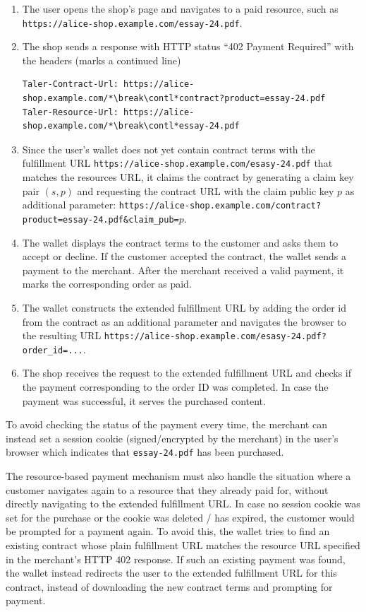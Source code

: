 \begin{enumerate}
  \item The user opens the shop's page and navigates to a paid resource, such
    as \nolinkurl{https://alice-shop.example.com/essay-24.pdf}.
  \item The shop sends a response with HTTP status ``402 Payment Required''
    with the headers (\contl marks a continued line)
\begin{lstlisting}[style=myhttp]
Taler-Contract-Url: https://alice-shop.example.com/*\break\contl*contract?product=essay-24.pdf
Taler-Resource-Url: https://alice-shop.example.com/*\break\contl*essay-24.pdf
\end{lstlisting}
  \item Since the user's wallet does not yet contain contract terms with the
    fulfillment URL \nolinkurl{https://alice-shop.example.com/esasy-24.pdf}
    that matches the resources URL, it claims the contract by generating a
    claim key pair $(s, p)$  and requesting the contract URL with the claim
    public key $p$ as additional parameter:
    \nolinkurl{https://alice-shop.example.com/contract?product=essay-24.pdf\&claim_pub=}$p$.
  \item The wallet displays the contract terms to the customer and asks them to
    accept or decline.  If the customer accepted the contract, the wallet sends
    a payment to the merchant.  After the merchant received a valid payment,
    it marks the corresponding order as paid.
  \item The wallet constructs the extended fulfillment URL by adding the order
    id from the contract as an additional parameter and navigates the browser
    to the resulting URL
    \nolinkurl{https://alice-shop.example.com/esasy-24.pdf?order\_id=...}.
  \item The shop receives the request to the extended fulfillment URL and
    checks if the payment corresponding to the order ID was completed.  In case
    the payment was successful, it serves the purchased content.
\end{enumerate}

To avoid checking the status of the payment every time, the merchant can
instead set a session cookie (signed/encrypted by the merchant) in the user's
browser which indicates that \texttt{essay-24.pdf} has been purchased.

The resource-based payment mechanism must also handle the situation where a
customer navigates again to a resource that they already paid for, without
directly navigating to the extended fulfillment URL.  In case no session cookie
was set for the purchase or the cookie was deleted / has expired, the customer would
be prompted for a payment again.  To avoid this, the wallet tries to find an
existing contract whose plain fulfillment URL matches the resource URL
specified in the merchant's HTTP 402 response.  If such an existing payment was
found, the wallet instead redirects the user to the extended fulfillment URL
for this contract, instead of downloading the new contract terms and prompting
for payment.

